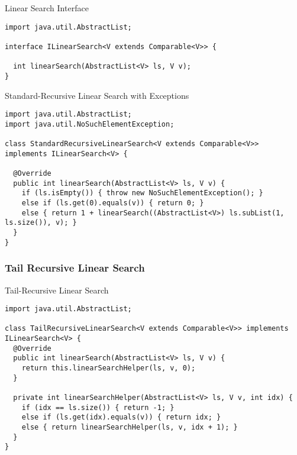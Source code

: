 \begin{cl}{Linear Search Interface}
\begin{lstlisting}[language=MyJava]
import java.util.AbstractList;

interface ILinearSearch<V extends Comparable<V>> {
  
  int linearSearch(AbstractList<V> ls, V v);
}
\end{lstlisting}
\end{cl}

\begin{cl}{Standard-Recursive Linear Search with Exceptions}
\begin{lstlisting}[language=MyJava]
import java.util.AbstractList;
import java.util.NoSuchElementException;
  
class StandardRecursiveLinearSearch<V extends Comparable<V>> implements ILinearSearch<V> {
  
  @Override
  public int linearSearch(AbstractList<V> ls, V v) {
    if (ls.isEmpty()) { throw new NoSuchElementException(); }
    else if (ls.get(0).equals(v)) { return 0; }
    else { return 1 + linearSearch((AbstractList<V>) ls.subList(1, ls.size()), v); }
  }
}
\end{lstlisting}
\end{cl}

\subsubsection*{Tail Recursive Linear Search}

\begin{cl}{Tail-Recursive Linear Search}
\begin{lstlisting}[language=MyJava]
import java.util.AbstractList;

class TailRecursiveLinearSearch<V extends Comparable<V>> implements ILinearSearch<V> {
  @Override
  public int linearSearch(AbstractList<V> ls, V v) {
    return this.linearSearchHelper(ls, v, 0);
  }

  private int linearSearchHelper(AbstractList<V> ls, V v, int idx) {
    if (idx == ls.size()) { return -1; }
    else if (ls.get(idx).equals(v)) { return idx; }
    else { return linearSearchHelper(ls, v, idx + 1); }
  }
}
\end{lstlisting}
\end{cl}

